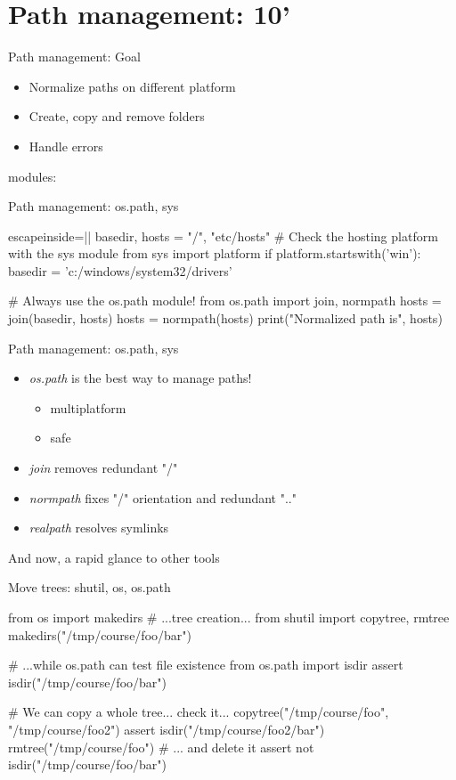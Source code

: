 \section{Path management: 10'}

\begin{pyframe}{Path management: Goal}
\Large
\begin{itemize}
\item Normalize paths on different platform
\item Create, copy and remove folders
\item Handle errors
\end{itemize}
modules: 
\end{pyframe}

\begin{pyframe}{Path management: os.path, sys}
\begin{pythoncode*}{escapeinside=||}
basedir, hosts = "/", "etc/hosts" 
# Check the hosting platform with the sys module
from sys import platform
if platform.startswith('win'):
    basedir = 'c:/windows/system32/drivers'

# Always use the os.path module!
from os.path import join, normpath 
hosts = join(basedir, hosts)
hosts = normpath(hosts)
print("Normalized path is", hosts)
\end{pythoncode*}
\end{pyframe}

\begin{pyframe}{Path management: os.path, sys}
\Large
\begin{itemize}
\item \emph{os.path} is the best way to manage paths!
\begin{itemize}
 \Large
 \item multiplatform
 \item safe
 \end{itemize}
 
\item \emph{join} removes redundant "/"
\item \emph{normpath} fixes "/" orientation and redundant ".."
\item \emph{realpath} resolves symlinks
\end{itemize}
And now, a rapid glance to other tools \ellipsis
\end{pyframe}

\begin{pyframe}{Move trees: shutil, os, os.path}
\begin{pythoncode}
from os import makedirs     # ...tree creation...
from shutil import copytree, rmtree 
makedirs("/tmp/course/foo/bar")

# ...while os.path can test file existence
from os.path import isdir            
assert isdir("/tmp/course/foo/bar")

# We can copy a whole tree... check it...
copytree("/tmp/course/foo", "/tmp/course/foo2") 
assert isdir("/tmp/course/foo2/bar")            
rmtree("/tmp/course/foo") # ... and delete it
assert not isdir("/tmp/course/foo/bar")
\end{pythoncode}
\end{pyframe}

